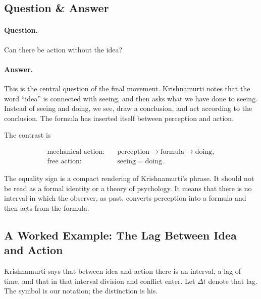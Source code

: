 \subsection{Question \& Answer}

\paragraph{Question.}
Can there be action without the idea?

\paragraph{Answer.}
This is the central question of the final movement. Krishnamurti notes that the word ``idea'' is connected with seeing, and then asks what we have done to seeing. Instead of seeing and doing, we see, draw a conclusion, and act according to the conclusion. The formula has inserted itself between perception and action.

The contrast is

\begin{align}
\text{mechanical action:}\quad
&\text{perception}
\rightarrow
\text{formula}
\rightarrow
\text{doing},\\
\text{free action:}\quad
&\text{seeing}
=
\text{doing}.
\end{align}

The equality sign is a compact rendering of Krishnamurti's phrase. It should not be read as a formal identity or a theory of psychology. It means that there is no interval in which the observer, as past, converts perception into a formula and then acts from the formula.

\subsection{A Worked Example: The Lag Between Idea and Action}

Krishnamurti says that between idea and action there is an interval, a lag of time, and that in that interval division and conflict enter. Let \(\Delta t\) denote that lag. The symbol is our notation; the distinction is his.

